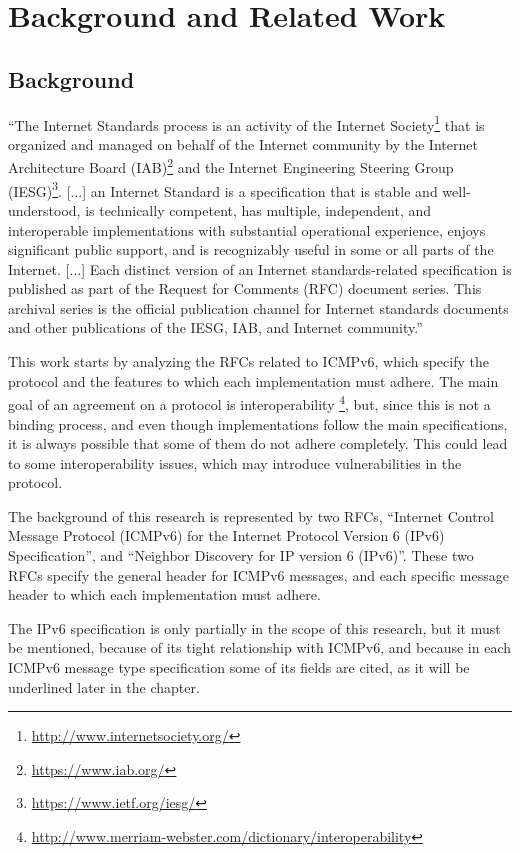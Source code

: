 \documentclass[12pt]{article}
\begin{document}
\section{Background and Related Work}
\label{sec:2}


\subsection{Background}
\label{sub:background}

``The Internet Standards process is an activity of the Internet Society\footnote{\url{http://www.internetsociety.org/}} that is organized and managed on behalf of the Internet community by the Internet Architecture Board (IAB)\footnote{\url{https://www.iab.org/}} and the Internet Engineering Steering Group (IESG)\footnote{\url{https://www.ietf.org/iesg/}}. [...] an Internet Standard is a specification that is stable and well-understood, is technically competent, has multiple, independent, and interoperable implementations with substantial operational experience, enjoys significant public support, and is recognizably useful in some or all parts of the Internet. [...] Each distinct version of an Internet standards-related specification is published as part of the Request for Comments (RFC) document series.  This archival series is the official publication channel for Internet standards documents and other publications of the IESG, IAB, and Internet community.''\cite{rfc2026}

This work starts by analyzing the RFCs related to ICMPv6, which specify the protocol and the features to which each implementation must adhere. The main goal of an agreement on a protocol is interoperability \footnote{\url{http://www.merriam-webster.com/dictionary/interoperability}}, but, since this is not a binding process, and even though implementations follow the main specifications, it is always possible that some of them do not adhere completely. This could lead to some interoperability issues, which may introduce vulnerabilities in the protocol.

The background of this research is represented by two RFCs, ``Internet Control Message Protocol (ICMPv6) for the Internet Protocol Version 6 (IPv6) Specification''\cite{rfc4443}, and ``Neighbor Discovery for IP version 6 (IPv6)''\cite{rfc4861}. These two RFCs specify the general header for ICMPv6 messages, and each specific message header to which each implementation must adhere.

The IPv6 specification\cite{rfc2460} is only partially in the scope of this research, but it must be mentioned, because of its tight relationship with ICMPv6, and because in each ICMPv6 message type specification some of its fields are cited, as it will be underlined later in the chapter.
\end{document}
